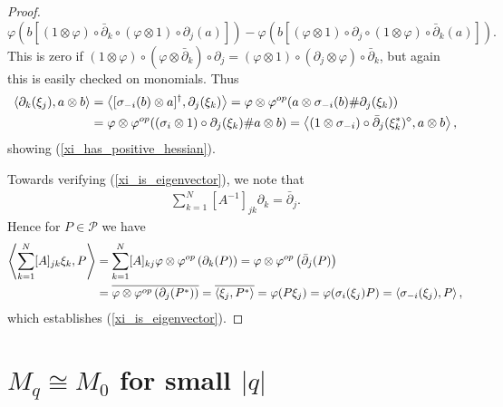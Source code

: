 \begin{proof}
	\begin{equation*}
		\varphi(b[(1\otimes \varphi)\circ\bar{\partial}_k\circ(\varphi\otimes 1)\circ\partial_j(a)]) -\varphi(b[(\varphi\otimes 1)\circ\partial_j\circ(1\otimes \varphi)\circ\bar{\partial}_k(a)]).
	\end{equation*}
This is zero if $(1\otimes\varphi)\circ(\varphi\otimes \bar{\partial}_k)\circ\partial_j = (\varphi\otimes 1)\circ(\partial_j \otimes \varphi)\circ\bar{\partial}_k$, but again this is easily checked on monomials. Thus
	\begin{align*}
		\left\langle\partial_k(\xi_j),a\otimes b\right\rangle&=\left\langle[\sigma_{-i}(b)\otimes a]^\dagger, \partial_j(\xi_k)\right\rangle=\varphi\otimes \varphi^{op}(a\otimes \sigma_{-i}(b)\#\partial_j(\xi_k))\\
				&=\varphi\otimes \varphi^{op}( (\sigma_i\otimes 1)\circ\partial_j(\xi_k)\# a\otimes b)=\left\langle(1\otimes \sigma_{-i})\circ\bar{\partial}_j(\xi_k^*)^\diamond, a\otimes b\right\rangle,
	\end{align*}
showing (\ref{xi_has_positive_hessian}).\par
Towards verifying (\ref{xi_is_eigenvector}), we note that
	\begin{align*}
		\sum_{k=1}^N \left[A^{-1}\right]_{jk}\partial_k = \bar{\partial}_j.
	\end{align*}
Hence for $P\in\mathscr{P}$ we have
	\begin{align*}
		\left\langle \sum_{k=1}^N [A]_{jk} \xi_k, P\right\rangle &= \sum_{k=1}^N [A]_{kj} \varphi\otimes\varphi^{op}\left(\partial_k(P)\right) = \varphi\otimes\varphi^{op}\left( \bar{\partial}_j(P) \right)\\
						& = \overline{\varphi\otimes\varphi^{op}\left( \partial_j(P^*)\right)}= \overline{\left\langle\xi_j, P^*\right\rangle}=\varphi(P\xi_j)=\varphi(\sigma_i(\xi_j)P)=\left\langle\sigma_{-i}(\xi_j),P\right\rangle,
	\end{align*}
which establishes (\ref{xi_is_eigenvector}).
\end{proof}

\section{$M_q\cong M_0$ for small $|q|$}

